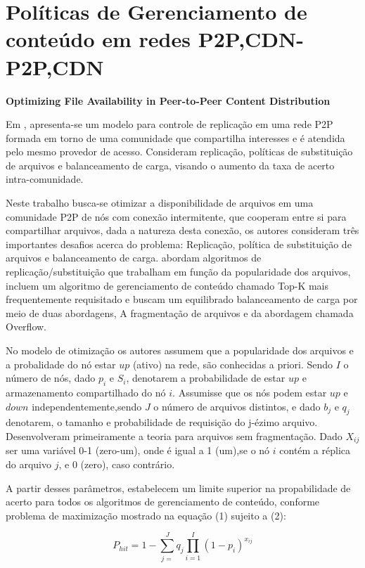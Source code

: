 \documentclass[
	12pt,				%
	oneside,			%
	a4paper,			%
	english,			%
	brazil				%
	]{abntex2ppgsi}
\begin{document}
\section{Políticas de Gerenciamento de conteúdo em redes P2P,CDN-P2P,CDN}

\textbf{Optimizing File Availability in Peer-to-Peer Content Distribution}
\newline

Em \cite{Kangasharju2007}, apresenta-se um modelo para controle de replicação em uma rede P2P formada em torno de uma comunidade que compartilha interesses e é atendida pelo mesmo provedor de acesso. Consideram replicação, políticas de substituição de arquivos e balanceamento de carga, visando o aumento da taxa de acerto intra-comunidade.

Neste trabalho busca-se otimizar a disponibilidade de arquivos em uma comunidade P2P de nós com conexão intermitente, que cooperam entre si para compartilhar arquivos, dada a natureza desta conexão, os autores consideram três importantes desafios acerca do problema: Replicação, política de substituição de arquivos e balanceamento de carga. abordam algoritmos de replicação/substituição que trabalham em função da popularidade dos arquivos, incluem um algoritmo de gerenciamento de conteúdo chamado Top-K mais frequentemente requisitado e buscam um equilibrado balanceamento de carga por meio de duas abordagens, A fragmentação de arquivos e da abordagem chamada Overflow.

No modelo de otimização os autores assumem que a popularidade dos arquivos e a probalidade do nó estar $up$ (ativo) na rede, são conhecidas a priori. Sendo $I$ o número de nós, dado $p_i$ e $S_i$, denotarem a probabilidade de estar $up$ e armazenamento compartilhado do nó $i$. Assumisse que os nós podem estar $up$ e $down$ independentemente,sendo $J$ o número de arquivos distintos, e dado $b_j$ e $q_j$ denotarem, o tamanho e probabilidade de requisição do j-ézimo arquivo.
Desenvolveram primeiramente a teoria para arquivos sem fragmentação. Dado $X_{ij}$ ser uma variável 0-1 (zero-um), onde é igual a 1 (um),se o nó $i$ contém a réplica do arquivo $j$, e 0 (zero), caso contrário. 

A partir desses parâmetros, estabelecem um limite superior na propabilidade de acerto para todos os algoritmos de gerenciamento de conteúdo, conforme problema de maximização mostrado na equação (1) sujeito a (2):

\begin{equation}
P_{hit} = 1 -\sum_{j=}^{J}q_j\prod_{i=1}^{I}(1-p_i)^{x_{ij}}
\end{equation}
\end{document}
